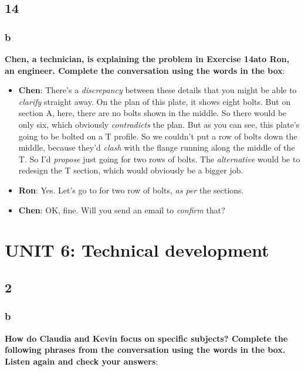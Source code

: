 \subsection{14}

\subsubsection{b}

\textbf{Chen, a technician, is explaining the problem in Exercise 14ato Ron, an engineer. Complete the conversation using the words in the box}:

\begin{itemize}

\item{\textbf{Chen}}: There's a \textit{discrepancy} between these details that you might be able to \textit{clarify} straight away. On the plan of this plate, it shows eight bolts. But on section A, here, there are no bolts shown in the middle. So there would be only six, which obviously \textit{contradicts} the plan. But as you can see, this plate's going to be bolted on a T profile. So we couldn't put a row of bolts down the middle, because they'd \textit{clash} with the flange running along the middle of the T. So I'd \textit{propose} just going for two rows of bolts. The \textit{alternative} would be to redesign the T section, which would obviously be a bigger job.

\item{\textbf{Ron}}: Yes. Let's go to for two row of bolts, \textit{as per} the sections.
\item{\textbf{Chen}}: OK, fine. Will you send an email to \textit{confirm} that?

\end{itemize}


\section{UNIT 6: Technical development}

\subsection{2}

\subsubsection{b}

\textbf{How do Claudia and Kevin focus on specific subjects? Complete the following phrases from the conversation using the words in the box. Listen again and check your answers}:

